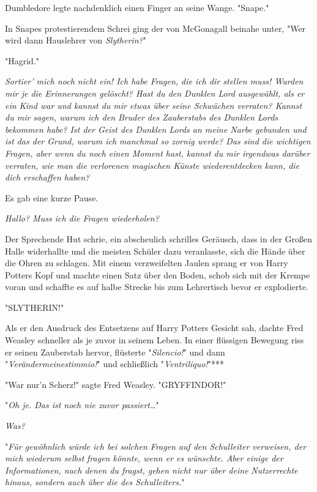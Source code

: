 {Dumbledore legte nachdenklich einen Finger an seine Wange. "Snape."

In Snapes protestierendem Schrei ging der von McGonagall beinahe unter, "Wer wird dann Hauslehrer von \emph{Slytherin?}"

"Hagrid."

\later

\emph{Sortier' mich noch nicht ein! Ich habe Fragen, die ich dir stellen muss! Wurden mir je die Erinnerungen gelöscht? Hast du den Dunklen Lord ausgewählt, als er ein Kind war und kannst du mir etwas über seine Schwächen verraten? Kannst du mir sagen, warum ich den Bruder des Zauberstabs des Dunklen Lords bekommen habe? Ist der Geist des Dunklen Lords an meine Narbe gebunden und ist das der Grund, warum ich manchmal so zornig werde? Das sind die wichtigen Fragen, aber wenn du noch einen Moment hast, kannst du mir irgendwas darüber verraten, wie man die verlorenen magischen Künste wiederentdecken kann, die dich erschaffen haben?}

Es gab eine kurze Pause.

\emph{Hallo? Muss ich die Fragen wiederholen?}

Der Sprechende Hut schrie, ein abscheulich schrilles Geräusch, dass in der Großen Halle widerhallte und die meisten Schüler dazu veranlasste, sich die Hände über die Ohren zu schlagen. Mit einem verzweifelten Jaulen sprang er von Harry Potters Kopf und machte einen Satz über den Boden, schob sich mit der Krempe voran und schaffte es auf halbe Strecke bis zum Lehrertisch bevor er explodierte.

\later

"SLYTHERIN!"

Als er den Ausdruck des Entsetzens auf Harry Potters Gesicht sah, dachte Fred Weasley schneller als je zuvor in seinem Leben. In einer flüssigen Bewegung riss er seinen Zauberstab hervor, flüsterte "\emph{Silencio!}" und dann "\emph{Verändermeinestimmio!}" und schließlich "\emph{Ventriliquo!}"***

"War nur'n Scherz!" sagte Fred Weasley. "GRYFFINDOR!"

\later

"\emph{Oh je. Das ist noch nie zuvor passiert…}"

\emph{Was?}

"\emph{Für gewöhnlich würde ich bei solchen Fragen auf den Schulleiter verweisen, der mich} \emph{wiederum selbst} \emph{fragen könnte, wenn er es wünschte. Aber einige der Informationen, nach denen du fragst, gehen nicht nur über deine} \emph{Nutzerrechte} \emph{hinaus, sondern auch über die des Schulleiters.}"

}

